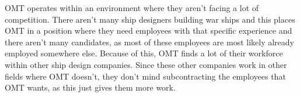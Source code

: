 OMT operates within an environment where they aren't facing a lot of competition. 
There aren't many ship designers building war ships and this places OMT in a position where they need employees with that specific experience and there aren't many candidates, as most of these employees are most likely already employed somewhere else.
Because of this, OMT finds a lot of their workforce within other ship design companies. 
Since these other companies work in other fields where OMT doesn't, they don't mind subcontracting the employees that OMT wants, as this just gives them more work. 